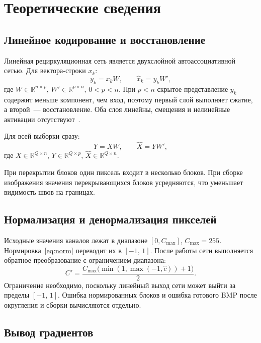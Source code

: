 \section{Теоретические сведения}
\label{sec:theory}

\subsection{Линейное кодирование и восстановление}
\label{sec:theory-code}

Линейная рециркуляционная сеть является двухслойной автоассоциативной сетью. Для вектора-строки $x_k$:
\begin{equation}
	y_k = x_k W, \qquad \hat{x}_k = y_k W',
	\label{eq:forward}
\end{equation}
где $W \in \mathbb{R}^{n \times p}$, $W' \in \mathbb{R}^{p \times n}$, $0<p<n$. При $p<n$ скрытое представление $y_k$ содержит меньше компонент, чем вход, поэтому первый слой выполняет сжатие, а второй~--- восстановление. Оба слоя линейны, смещения и нелинейные активации отсутствуют~\cite{haykin}.

Для всей выборки сразу:
\begin{equation}
	Y = XW, \qquad \hat{X} = YW',
\end{equation}
где $X \in \mathbb{R}^{Q \times n}$, $Y \in \mathbb{R}^{Q \times p}$, $\hat{X} \in \mathbb{R}^{Q \times n}$.

При перекрытии блоков один пиксель входит в несколько блоков. При сборке изображения значения перекрывающихся блоков усредняются, что уменьшает видимость швов на границах.

\subsection{Нормализация и денормализация пикселей}
\label{sec:theory-norm}

Исходные значения каналов лежат в диапазоне $[0,C_{\max}]$, $C_{\max}=255$. Нормировка~\eqref{eq:norm} переводит их в $[-1,\,1]$. После работы сети выполняется обратное преобразование с ограничением диапазона:
\begin{equation}
	C' = \frac{C_{\max}\bigl(\min(1,\max(-1,\hat{c}))+1\bigr)}{2}.
	\label{eq:denorm}
\end{equation}
Ограничение необходимо, поскольку линейный выход сети может выйти за пределы $[-1,\,1]$. Ошибка нормированных блоков и ошибка готового BMP после округления и сборки вычисляются отдельно.

\subsection{Вывод градиентов}
\label{sec:theory-grad}

